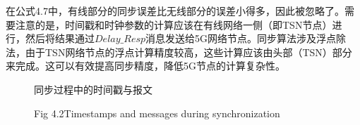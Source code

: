 \documentclass[UTF8,a4paper,12pt]{ctexart}
\numberwithin{equation}{section}
\begin{document}
	在公式4.7中，有线部分的同步误差比无线部分的误差小得多，因此被忽略了。需要注意的是，时间戳和时钟参数的计算应该在有线网络一侧（即TSN节点）进行，然后将结果通过$Delay\_Resp$消息发送给5G网络节点。同步算法涉及浮点除法，由于TSN网络节点的浮点计算精度较高，这些计算应该由头部（TSN）部分来完成。这可以有效提高同步精度，降低5G节点的计算复杂性。
	\begin{figure}[H] 
		\caption{同步过程中的时间戳与报文}
		\vspace{-10pt}
		\caption*{Fig 4.2\quad Timestamps and messages during synchronization} 
	\end{figure}
	
\end{document}
